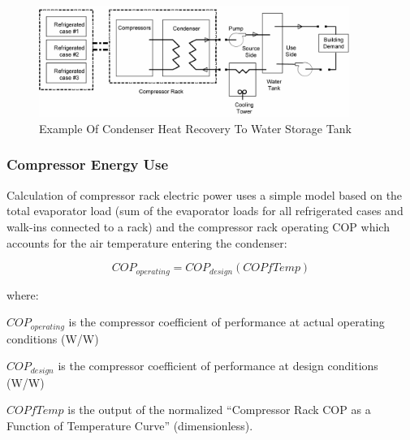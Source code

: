 \begin{figure}[hbtp] %
\centering
\includegraphics[width=0.9\textwidth, height=0.9\textheight, keepaspectratio=true]{media/image6093.png}
\caption{Example Of Condenser Heat Recovery To Water Storage Tank \protect \label{fig:example-of-condenser-heat-recovery-to-water}}
\end{figure}

\subsubsection{Compressor Energy Use}\label{compressor-energy-use}

Calculation of compressor rack electric power uses a simple model based on the total evaporator load (sum of the evaporator loads for all refrigerated cases and walk-ins connected to a rack) and the compressor rack operating COP which accounts for the air temperature entering the condenser:

\begin{equation}
CO{P_{operating}} = CO{P_{design}}\left( {COPfTemp} \right)
\end{equation}

where:

\(CO{P_{operating}}\) is the compressor coefficient of performance at actual operating conditions (W/W)

\(CO{P_{design}}\) is the compressor coefficient of performance at design conditions (W/W)

\(COPfTemp\) is the output of the normalized ``Compressor Rack COP as a Function of Temperature Curve'' (dimensionless).

